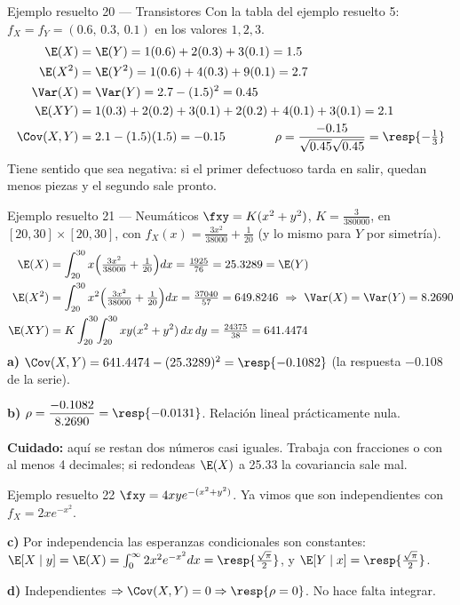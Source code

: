 \begin{ejemplo}{Ejemplo resuelto 20 --- Transistores }
Con la tabla del ejemplo resuelto 5: $f_X=f_Y=(0.6,\,0.3,\,0.1)$ en los valores $1,2,3$.
\begin{align*}
\E(X)&=\E(Y)=1(0.6)+2(0.3)+3(0.1)=1.5\\
\E(X^2)&=\E(Y^2)=1(0.6)+4(0.3)+9(0.1)=2.7\\
\Var(X)&=\Var(Y)=2.7-(1.5)^2=0.45\\
\E(XY)&=1(0.3)+2(0.2)+3(0.1)+2(0.2)+4(0.1)+3(0.1)=2.1\\
\Cov(X,Y)&=2.1-(1.5)(1.5)=-0.15\qquad\qquad\rho=\frac{-0.15}{\sqrt{0.45}\sqrt{0.45}}=\resp{-\tfrac13}
\end{align*}
Tiene sentido que sea negativa: si el primer defectuoso tarda en salir, quedan menos piezas y el segundo sale pronto.
\end{ejemplo}

\begin{ejemplo}{Ejemplo resuelto 21 --- Neum\'aticos }
$\fxy=K(x^2+y^2)$, $K=\tfrac{3}{380000}$, en $[20,30]\times[20,30]$, con $f_X(x)=\tfrac{3x^2}{38000}+\tfrac1{20}$
(y lo mismo para $Y$ por simetr\'ia).
{\small\begin{align*}
\E(X)&=\int_{20}^{30}x\Big(\tfrac{3x^2}{38000}+\tfrac1{20}\Big)dx=\tfrac{1925}{76}=25.3289=\E(Y)\\
\E(X^2)&=\int_{20}^{30}x^2\Big(\tfrac{3x^2}{38000}+\tfrac1{20}\Big)dx=\tfrac{37040}{57}=649.8246\ \Rightarrow\ \Var(X)=\Var(Y)=8.2690\\
\E(XY)&=K\int_{20}^{30}\!\!\int_{20}^{30}xy(x^2+y^2)\,dx\,dy=\tfrac{24375}{38}=641.4474
\end{align*}}
\textbf{a)} $\Cov(X,Y)=641.4474-(25.3289)^2=\resp{-0.1082}$ (la respuesta $-0.108$ de la serie).

\textbf{b)} $\rho=\dfrac{-0.1082}{8.2690}=\resp{-0.0131}$. Relaci\'on lineal pr\'acticamente nula.

\textbf{Cuidado:} aqu\'i se restan dos n\'umeros casi iguales. Trabaja con fracciones o con al menos 4 decimales; si redondeas
$\E(X)$ a 25.33 la covariancia sale mal.
\end{ejemplo}

\begin{ejemplo}{Ejemplo resuelto 22 }
$\fxy=4xye^{-(x^2+y^2)}$. Ya vimos que son independientes con $f_X=2xe^{-x^2}$.

\textbf{c)} Por independencia las esperanzas condicionales son constantes:
$\E[X\mid y]=\E(X)=\int_0^\infty2x^2e^{-x^2}dx=\resp{\tfrac{\sqrt\pi}{2}}$, y $\E[Y\mid x]=\resp{\tfrac{\sqrt\pi}{2}}$.

\textbf{d)} Independientes $\Rightarrow\Cov(X,Y)=0\Rightarrow\resp{\rho=0}$. No hace falta integrar.
\end{ejemplo}

